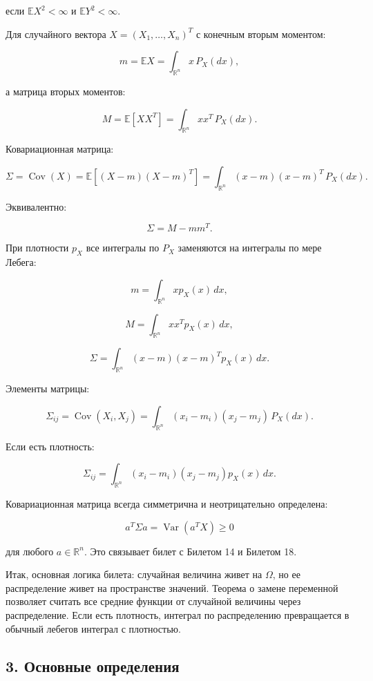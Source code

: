 \documentclass[
  11pt,
  a4paper,
]{article}
\begin{document}
если \(\mathbb E X^2<\infty\) и \(\mathbb E Y^2<\infty\).

Для случайного вектора \(X=(X_1,\ldots,X_n)^T\) с конечным вторым
моментом:

\[
m=\mathbb EX
=
\int_{\mathbb R^n}x\,P_X(dx),
\]

а матрица вторых моментов:

\[
M=\mathbb E[XX^T]
=
\int_{\mathbb R^n}xx^T\,P_X(dx).
\]

Ковариационная матрица:

\[
\Sigma
=
\operatorname{Cov}(X)
=
\mathbb E[(X-m)(X-m)^T]
=
\int_{\mathbb R^n}(x-m)(x-m)^T\,P_X(dx).
\]

Эквивалентно:

\[
\Sigma=M-mm^T.
\]

При плотности \(p_X\) все интегралы по \(P_X\) заменяются на интегралы
по мере Лебега:

\[
m=\int_{\mathbb R^n}x p_X(x)\,dx,
\]

\[
M=\int_{\mathbb R^n}xx^T p_X(x)\,dx,
\]

\[
\Sigma=\int_{\mathbb R^n}(x-m)(x-m)^T p_X(x)\,dx.
\]

Элементы матрицы:

\[
\Sigma_{ij}
=
\operatorname{Cov}(X_i,X_j)
=
\int_{\mathbb R^n}(x_i-m_i)(x_j-m_j)\,P_X(dx).
\]

Если есть плотность:

\[
\Sigma_{ij}
=
\int_{\mathbb R^n}(x_i-m_i)(x_j-m_j)p_X(x)\,dx.
\]

Ковариационная матрица всегда симметрична и неотрицательно определена:

\[
a^T\Sigma a
=
\operatorname{Var}(a^TX)
\ge0
\]

для любого \(a\in\mathbb R^n\). Это связывает билет с Билетом 14 и
Билетом 18.

Итак, основная логика билета: случайная величина живет на \(\Omega\), но
ее распределение живет на пространстве значений. Теорема о замене
переменной позволяет считать все средние функции от случайной величины
через распределение. Если есть плотность, интеграл по распределению
превращается в обычный лебегов интеграл с плотностью.

\subsection{3. Основные
определения}\label{ux43eux441ux43dux43eux432ux43dux44bux435-ux43eux43fux440ux435ux434ux435ux43bux435ux43dux438ux44f}
\end{document}
